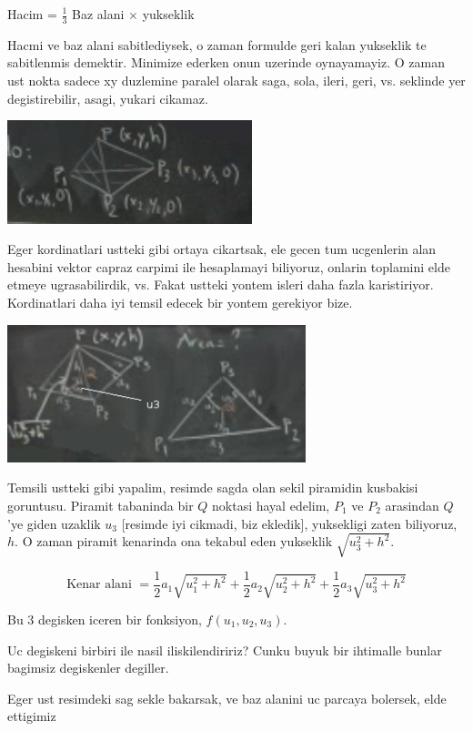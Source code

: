 \documentclass[12pt,fleqn]{article}\usepackage{../common}
\begin{document}
Hacim = $\frac{1}{3}$ Baz alani $\times$ yukseklik

Hacmi ve baz alani sabitlediysek, o zaman formulde geri kalan yukseklik te
sabitlenmis demektir. Minimize ederken onun uzerinde oynayamayiz. O zaman
ust nokta sadece xy duzlemine paralel olarak saga, sola, ileri, geri,
vs. seklinde yer degistirebilir, asagi, yukari cikamaz. 

\includegraphics[height=3cm]{13_9.png}

Eger kordinatlari ustteki gibi ortaya cikartsak, ele gecen tum ucgenlerin
alan hesabini vektor capraz carpimi ile hesaplamayi biliyoruz, onlarin
toplamini elde etmeye ugrasabilirdik, vs. Fakat ustteki yontem isleri daha
fazla karistiriyor. Kordinatlari daha iyi temsil edecek bir yontem
gerekiyor bize.

\includegraphics[height=4cm]{13_10.png}

Temsili ustteki gibi yapalim, resimde sagda olan sekil piramidin kusbakisi
goruntusu. Piramit tabaninda bir $Q$ noktasi hayal edelim, $P_1$  ve $P_2$
arasindan $Q$'ye giden uzaklik $u_3$ [resimde iyi cikmadi, biz ekledik],
yuksekligi zaten biliyoruz, $h$. O zaman piramit kenarinda ona tekabul eden
yukseklik $\sqrt{u_3^2 + h^2}$. 

\[ \textrm{Kenar alani } = 
\frac{1}{2}a_1 \sqrt{u_1^2 + h^2} + 
\frac{1}{2}a_2 \sqrt{u_2^2 + h^2} + 
\frac{1}{2}a_3 \sqrt{u_3^2 + h^2} 
 \]

Bu 3 degisken iceren bir fonksiyon, $f(u_1,u_2,u_3)$. 

Uc degiskeni birbiri ile nasil iliskilendiririz? Cunku buyuk bir ihtimalle
bunlar bagimsiz degiskenler degiller.

Eger ust resimdeki sag sekle bakarsak, ve baz alanini uc parcaya bolersek,
elde ettigimiz
\end{document}
